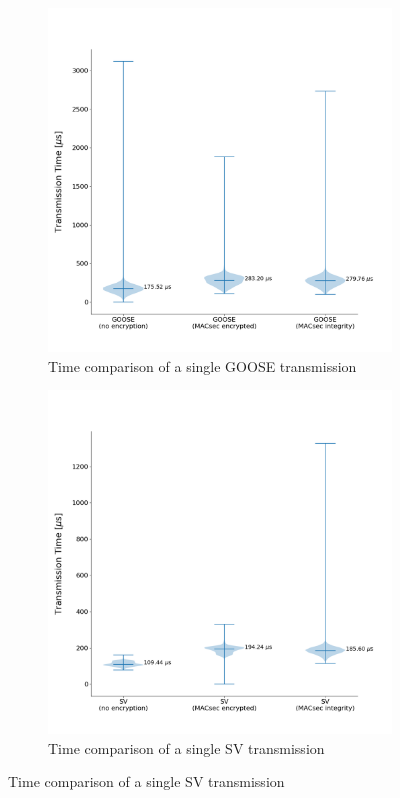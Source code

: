 \documentclass[conference, onecolumn, a4paper]{IEEEtran}
\begin{document}
\begin{figure}[h]
    \centering
    \begin{subfigure}[b]{0.49\textwidth}
        \centering
        \includegraphics[width=\textwidth]{images/GOOSE_group_all_configs.png}
        \caption{Time comparison of a single GOOSE transmission}
        \label{imgae:GOOSETimings}
    \end{subfigure}
    \hfill
    \begin{subfigure}[b]{0.49\textwidth}
        \centering
        \includegraphics[width=\textwidth]{images/SV_group_all_configs.png}
        \caption{Time comparison of a single SV transmission}
        \label{image:SVTimings}
    \end{subfigure}
\end{figure}
\end{document}
